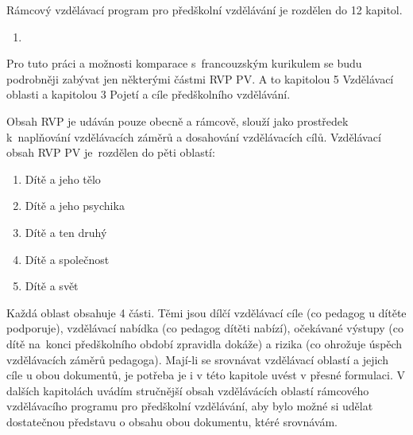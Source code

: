 		Rámcový vzdělávací program pro předškolní vzdělávání je rozdělen do 12 kapitol.
		\begin{enumerate}[1.]
			\setlength\itemsep{-2mm}

			\item \textit{} \citep[s.~?]{RVP}
		\end{enumerate}

		Pro tuto práci a možnosti komparace s francouzským kurikulem se budu podrobněji zabývat jen některými částmi RVP PV. A to kapitolou 5 Vzdělávací oblasti a kapitolou 3 Pojetí a cíle předškolního vzdělávání.

		Obsah RVP je udáván pouze obecně a rámcově, slouží jako prostředek k naplňování
		vzdělávacích záměrů a dosahování vzdělávacích cílů. Vzdělávací obsah RVP PV je rozdělen do pěti oblastí:

		\begin{enumerate}[1.]
			\setlength\itemsep{-2mm}
			\item Dítě a jeho tělo
			\item Dítě a jeho psychika
			\item Dítě a ten druhý
			\item Dítě a společnost
			\item Dítě a svět
		\end{enumerate}

		Každá oblast obsahuje 4 části. Těmi jsou dílčí vzdělávací cíle (co pedagog u dítěte podporuje), vzdělávací nabídka (co pedagog dítěti nabízí), očekávané výstupy (co dítě na konci předškolního období zpravidla dokáže) a rizika (co ohrožuje úspěch vzdělávacích záměrů pedagoga).
		Mají-li se srovnávat vzdělávací oblastí a jejich cíle u obou dokumentů, je potřeba je i v této kapitole uvést v přesné formulaci. 
		V dalších kapitolách uvádím stručnější obsah vzdělávácích oblastí rámcového vzdělávacího programu pro předškolní vzdělávání, aby bylo možné si udělat dostatečnou představu o obsahu obou dokumentu, ktéré srovnávám. 


